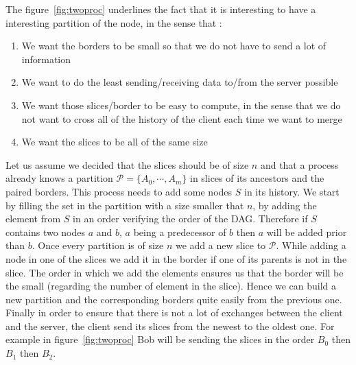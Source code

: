 The figure~\ref{fig:twoproc} underlines the fact that it is interesting to have a interesting partition of the node, in the sense that :
\begin{enumerate}
 \item We want the borders to be small so that we do not have to send a lot of information
 \item We want to do the least sending/receiving data to/from the server possible
 \item We want those slices/border to be easy to compute, in the sense that we do not want to cross all of the history of the client each time we want to merge
 \item We want the slices to be all of the same size
\end{enumerate}
Let us assume we decided that the slices should be of size $n$ and that a process already knows a partition $\mathcal{P} = \{A_0,\cdots,A_m\}$ in slices of its ancestors and the paired borders. This process needs to add some nodes $S$ in its history. We start by filling the set in the partition with a size smaller that $n$, by adding the element from $S$ in an order verifying the order of the DAG. Therefore if $S$ contains two nodes $a$ and $b$, $a$ being a predecessor of $b$ then $a$ will be added prior than $b$. Once every partition is of size $n$ we add a new slice to $\mathcal P$. While adding a node in one of the slices we add it in the border if one of its parents is not in the slice. The order in which we add the elements ensures us that the border will be the small (regarding the number of element in the slice). Hence we can build a new partition and the corresponding borders quite easily from the previous one. Finally in order to ensure that there is not a lot of exchanges between the client and the 
server, the client send its slices from the newest to the oldest one. For example in figure~\ref{fig:twoproc} Bob will be sending the slices in the order $B_0$ then $B_1$ then $B_2$.


